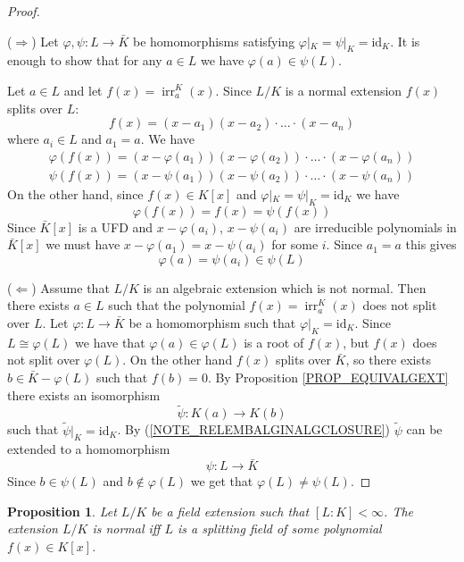 \documentclass[12pt, letterpaper, oneside]{article}
\theoremstyle{plain}
\newtheorem{proposition}[theorem]{Proposition}
\theoremstyle{definition}
\newcommand{\id}{\mathrm{id}}
\newcommand{\irr}{\operatorname{irr}}
\newcommand{\vs}{\vskip 5mm}
\begin{document}
\begin{proof} \ 

($\Rightarrow$) Let $\varphi, \psi \colon L \to \bar{K}$ be homomorphisms satisfying 
$\varphi|_{K} = \psi|_{K} = \id_{K}$.  It is enough to show that for any $a\in L$ we have
$\varphi(a) \in \psi(L)$. 

Let $a\in L$ and let $f(x) = \irr^{K}_{a}(x)$. Since $L/K$ is a normal extension $f(x)$
splits over $L$:
$$f(x) = (x-a_{1})(x-a_{2})\cdot{\dots}\cdot(x-a_{n})$$
where  $a_{i}\in L$ and $a_{1} = a$. 
We have 
\begin{align*}
\varphi(f(x)) = (x-\varphi(a_{1}))(x-\varphi(a_{2}))\cdot{\dots}\cdot(x-\varphi(a_{n})) \\
\psi(f(x)) =  (x-\psi(a_{1}))(x-\psi(a_{2}))\cdot{\dots}\cdot(x-\psi(a_{n})) 
\end{align*}
On the other hand, since $f(x)\in K[x]$ and $\varphi|_{K} = \psi|_{K} = \id_{K}$ 
we have 
$$\varphi(f(x)) = f(x) = \psi(f(x))$$
Since $\bar{K}[x]$ is a UFD and $x-\varphi(a_{i})$, $x-\psi(a_{i})$ are irreducible polynomials 
in $\bar{K}[x]$ we must have $x-\varphi(a_{1}) = x - \psi(a_{i})$ for some $i$. Since $a_{1}=a$
this gives 
$$\varphi(a) = \psi(a_{i}) \in \psi(L) $$

\vs


($\Leftarrow$) Assume that $L/K$ is an algebraic extension which is not normal. 
Then there exists $a\in L$ such that the polynomial $f(x) =\irr^{K}_{a}(x)$ does not
split over $L$. Let $\varphi\colon L \to \bar{K}$ be a homomorphism such that 
$\varphi|_{K} = \id_{K}$. Since $L\cong \varphi(L)$ we have that $\varphi(a)\in \varphi(L)$ 
is a root of $f(x)$, but $f(x)$ does not split over $\varphi(L)$. On the other hand 
$f(x)$ splits over $\bar{K}$, so there exists $b\in \bar{K}- \varphi(L)$ such that 
$f(b)= 0$. By Proposition \ref{PROP_EQUIVALGEXT} there exists an isomorphism 
$$\tilde \psi\colon K(a) \to K(b)$$
such that $\tilde \psi|_{K} = \id_{K}$.  By (\ref{NOTE_RELEMBALGINALGCLOSURE})
$\tilde \psi$ can be extended to a homomorphism 
$$\psi\colon L \to \bar{K}$$
Since $b\in \psi(L)$ and $b\not\in \varphi(L)$ we get that $\varphi(L)\neq \psi(L)$.

\end{proof}


\vs\vs


\begin{proposition}
Let $L/K$ be a field extension such that  $[L:K]<\infty$.  The extension 
$L/K$ is normal iff $L$ is a splitting field of some polynomial $f(x)\in K[x]$. 
\end{proposition}
\end{document}
